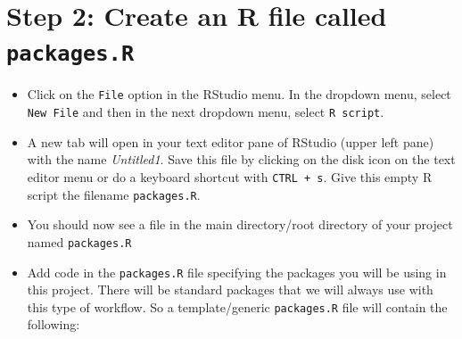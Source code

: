 \documentclass[
  12pt,
]{book}
\begin{document}
\hypertarget{step-2-create-an-r-file-called-packages.r}{%
\section{\texorpdfstring{Step 2: Create an R file called \texttt{packages.R}}{Step 2: Create an R file called packages.R}}\label{step-2-create-an-r-file-called-packages.r}}

\begin{itemize}
\item
  Click on the \texttt{File} option in the RStudio menu. In the dropdown menu, select \texttt{New\ File} and then in the next dropdown menu, select \texttt{R\ script}.
\item
  A new tab will open in your text editor pane of RStudio (upper left pane) with the name \emph{Untitled1}. Save this file by clicking on the disk icon on the text editor menu or do a keyboard shortcut with \texttt{CTRL\ +\ s}. Give this empty R script the filename \texttt{packages.R}.
\item
  You should now see a file in the main directory/root directory of your project named \texttt{packages.R}
\item
  Add code in the \texttt{packages.R} file specifying the packages you will be using in this project. There will be standard packages that we will always use with this type of workflow. So a template/generic \texttt{packages.R} file will contain the following:
\end{itemize}
\end{document}
